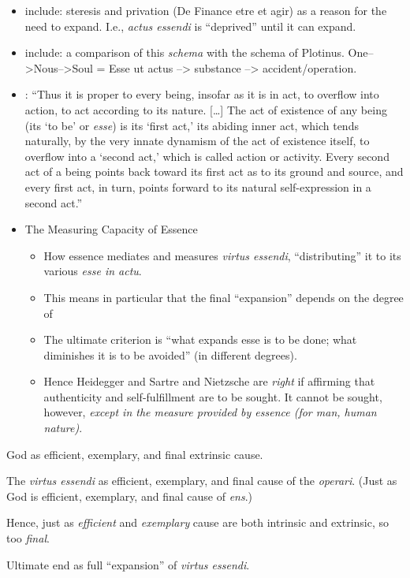 \begin{DONE}
\begin{NOTES}
\begin{itemize}
  \item include: steresis and privation (De Finance etre et agir) as a reason for the need to expand. I.e., \emph{actus essendi} is “deprived” until it can expand.

  \item include: a comparison of this \emph{schema} with the schema of Plotinus. One–>Nous–>Soul = Esse ut actus –> substance –> accident/operation.

  
  \item \cite[64]{clarke:action}: \enquote{Thus it is proper to every being, insofar as it is in act, to overflow into action, to act according to its nature. [\ldots] The act of existence of any being (its \enquote{to be} or \emph{esse}) is its \enquote{first act,} its abiding inner act, which tends naturally, by the very innate dynamism of the act of existence itself, to overflow into a \enquote{second act,} which is called action or activity. Every second act of a being points back toward its first act as to its ground and source, and every first act, in turn, points forward to its natural self-expression in a second act.}

  \item{The Measuring Capacity of Essence}

  \begin{itemize}
    \item How essence mediates and measures \emph{virtus essendi}, \enquote{distributing} it to its various \emph{esse in actu}.

    \item This means in particular that the final \enquote{expansion} depends on the degree of 

    \item The ultimate criterion is \enquote{what expands esse is to be done; what diminishes it is to be avoided} (in different degrees).

    \item Hence Heidegger and Sartre and Nietzsche are \emph{right} if affirming that authenticity and self-fulfillment are to be sought. It cannot be sought, however, \emph{except in the measure provided by essence (for man, human nature)}.
  \end{itemize}
\end{itemize}
	
God as efficient, exemplary, and final extrinsic cause.

The \emph{virtus essendi} as efficient, exemplary, and final cause of the \emph{operari}. (Just as God is efficient, exemplary, and final cause of \emph{ens}.)

Hence, just as \emph{efficient} and \emph{exemplary} cause are both intrinsic and extrinsic, so too \emph{final}.

Ultimate end as full \enquote{expansion} of \emph{virtus essendi}.

\end{NOTES}

\end{DONE}